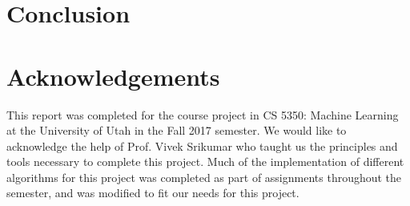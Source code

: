 \section{Conclusion}

\section*{Acknowledgements}
This report was completed for the course project in CS 5350: Machine Learning at the University of Utah in the Fall 2017 semester. We would like to acknowledge the help of Prof. Vivek Srikumar who taught us the principles and tools necessary to complete this project. Much of the implementation of different algorithms for this project was completed as part of assignments throughout the semester, and was modified to fit our needs for this project.